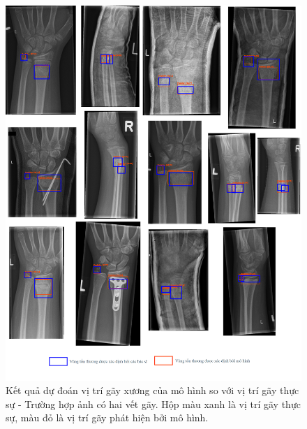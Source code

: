 \documentclass[../the.tex]{subfiles}
\begin{document}
\begin{figure}[H]
\centering
	\includegraphics[width=1\textwidth]{images/predict_2.png}
	\caption{Kết quả dự đoán vị trí gãy xương của mô hình so với vị trí gãy thực sự - Trường hợp ảnh có hai vết gãy. Hộp màu xanh là vị trí gãy thực sự, màu đỏ là vị trí gãy phát hiện bởi mô hình.}
	\label{fig:predict_2}
\end{figure}
\end{document}
